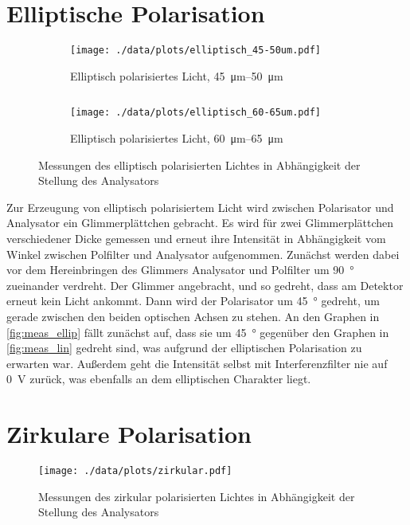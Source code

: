 \section{Elliptische Polarisation}\label{sec:ellip}
\begin{figure}[tb]
	\begin{subfigure}{.4\textwidth}
		\centering
		\texttt{[image: ./data/plots/elliptisch\_45-50um.pdf]}
		\caption[\SIrange{45}{50}{\micro\meter}]{Elliptisch polarisiertes Licht, \SIrange{45}{50}{\micro\meter}}
		\label{subfig:ellip_45_50}
	\end{subfigure}
	$\quad$
	\begin{subfigure}{.4\textwidth}
		\centering
		\texttt{[image: ./data/plots/elliptisch\_60-65um.pdf]}
		\caption[\SIrange{60}{65}{\micro\meter}]{Elliptisch polarisiertes Licht, \SIrange{60}{65}{\micro\meter}}
		\label{subfig:ellip_60_65}
	\end{subfigure}
	\caption[Elliptisch polarisiertes Licht]{Messungen des elliptisch polarisierten Lichtes in Abhängigkeit der Stellung des Analysators}
	\label{fig:meas_ellip}
\end{figure}
Zur Erzeugung von elliptisch polarisiertem Licht wird zwischen Polarisator und Analysator ein Glimmerplättchen gebracht.
Es wird für zwei Glimmerplättchen verschiedener Dicke gemessen und erneut ihre Intensität in Abhängigkeit vom Winkel zwischen Polfilter und Analysator aufgenommen.
Zunächst werden dabei vor dem Hereinbringen des Glimmers Analysator und Polfilter um \SI{90}{\degree} zueinander verdreht.
Der Glimmer angebracht, und so gedreht, dass am Detektor erneut kein Licht ankommt.
Dann wird der Polarisator um \SI{45}{\degree} gedreht, um gerade zwischen den beiden optischen Achsen zu stehen.
An den Graphen in \autoref{fig:meas_ellip} fällt zunächst auf, dass sie um \SI{45}{\degree} gegenüber den Graphen in \autoref{fig:meas_lin} gedreht sind, was aufgrund der elliptischen Polarisation zu erwarten war.
Außerdem geht die Intensität selbst mit Interferenzfilter nie auf \SI{0}{\volt} zurück, was ebenfalls an dem elliptischen Charakter liegt.

\section{Zirkulare Polarisation}
\begin{figure}
	\centering
	\texttt{[image: ./data/plots/zirkular.pdf]}
	\caption[Zirkular polarisiertes Licht]{Messungen des zirkular polarisierten Lichtes in Abhängigkeit der Stellung des Analysators}
	\label{fig:zircular}
\end{figure}

